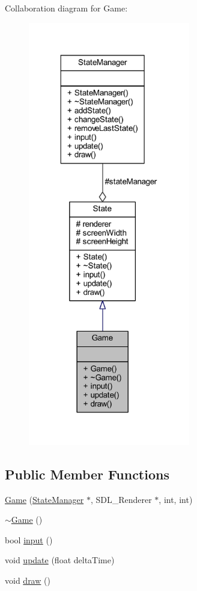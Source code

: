 Collaboration diagram for Game\+:
\nopagebreak
\begin{figure}[H]
\begin{center}
\leavevmode
\includegraphics[width=200pt]{class_game__coll__graph}
\end{center}
\end{figure}
\subsection*{Public Member Functions}
\begin{DoxyCompactItemize}
\item 
\hyperlink{class_game_a152727bb1c8f9af5cf824cd4ddbb055b}{Game} (\hyperlink{class_state_manager}{State\+Manager} $\ast$, S\+D\+L\+\_\+\+Renderer $\ast$, int, int)
\item 
\hyperlink{class_game_ae3d112ca6e0e55150d2fdbc704474530}{$\sim$\+Game} ()
\item 
bool \hyperlink{class_game_a6e3ee4ac1c5ee591527cd13cfb4cfab2}{input} ()
\item 
void \hyperlink{class_game_a419466336fad97182f5051e11f541636}{update} (float delta\+Time)
\item 
void \hyperlink{class_game_a6d54497ce3a66f6dd45eacfdccc8d0bd}{draw} ()
\end{DoxyCompactItemize}
